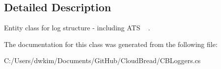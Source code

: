 \subsection{Detailed Description}
Entity class for log structure -\/ including A\+TS ~\newline
. 

The documentation for this class was generated from the following file\+:\begin{DoxyCompactItemize}
\item 
C\+:/\+Users/dwkim/\+Documents/\+Git\+Hub/\+Cloud\+Bread/C\+B\+Loggers.\+cs\end{DoxyCompactItemize}
